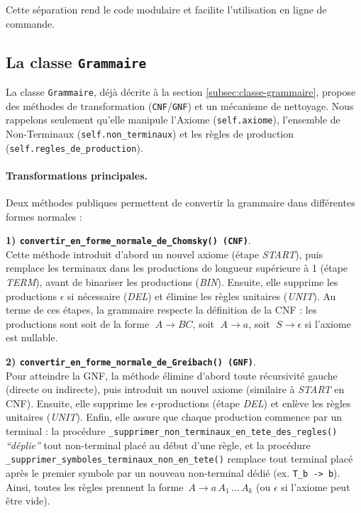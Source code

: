 \documentclass[a4paper,12pt]{article}
\begin{document}
\noindent
Cette séparation rend le code modulaire et facilite l’utilisation en ligne de commande.

\subsection{La classe \texttt{Grammaire}}
\label{subsec:classe-grammaire-detail}

La classe \texttt{Grammaire}, déjà décrite à la section \ref{subsec:classe-grammaire}, propose des méthodes de transformation (\texttt{CNF}/\texttt{GNF}) et un mécanisme de nettoyage. Nous rappelons seulement qu’elle manipule l’Axiome (\texttt{self.axiome}), l’ensemble de Non-Terminaux (\texttt{self.non\_terminaux}) et les règles de production (\texttt{self.regles\_de\_production}). 

\paragraph{Transformations principales.}
Deux méthodes publiques permettent de convertir la grammaire dans différentes formes normales :

\medskip

\textbf{1) \texttt{convertir\_en\_forme\_normale\_de\_Chomsky() (CNF)}}.\\
Cette méthode introduit d’abord un nouvel axiome (étape \emph{START}), puis remplace les terminaux dans les productions de longueur supérieure à 1 (étape \emph{TERM}), avant de binariser les productions (\emph{BIN}). Ensuite, elle supprime les productions \(\epsilon\) si nécessaire (\emph{DEL}) et élimine les règles unitaires (\emph{UNIT}). Au terme de ces étapes, la grammaire respecte la définition de la CNF : les productions sont soit de la forme \(\;A \to BC\), soit \(\;A \to a\), soit \(\;S \to \epsilon\) si l’axiome est nullable.

\bigskip

\textbf{2) \texttt{convertir\_en\_forme\_normale\_de\_Greibach() (GNF)}}.\\
Pour atteindre la GNF, la méthode élimine d’abord toute récursivité gauche (directe ou indirecte), puis introduit un nouvel axiome (similaire à \emph{START} en CNF). Ensuite, elle supprime les \(\epsilon\)-productions (étape \emph{DEL}) et enlève les règles unitaires (\emph{UNIT}). Enfin, elle assure que chaque production commence par un terminal : la procédure  \texttt{\_supprimer\allowbreak\_non\allowbreak\_terminaux\allowbreak\_en\allowbreak\_tete\allowbreak\_des\allowbreak\_regles()} \emph{“déplie”} tout non-terminal placé au début d’une règle, et la procédure \texttt{\_supprimer\_symboles\_terminaux\_non\_en\_tete()} remplace tout terminal placé après le premier symbole par un nouveau non-terminal dédié (ex. \texttt{T\_b -> b}). Ainsi, toutes les règles prennent la forme \(\,A \to a\,A_1\,\dots\,A_k\) (ou \(\epsilon\) si l’axiome peut être vide).
\end{document}
